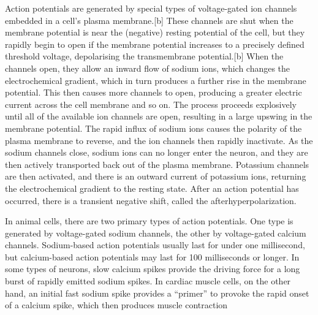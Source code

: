 Action potentials are generated by special types of voltage-gated ion channels embedded in a cell's plasma membrane.{[}b{]} These channels are shut when the membrane potential is near the (negative) resting potential of the cell, but they rapidly begin to open if the membrane potential increases to a precisely defined threshold voltage, depolarising the transmembrane potential.{[}b{]} When the channels open, they allow an inward flow of sodium ions, which changes the electrochemical gradient, which in turn produces a further rise in the membrane potential. This then causes more channels to open, producing a greater electric current across the cell membrane and so on. The process proceeds explosively until all of the available ion channels are open, resulting in a large upswing in the membrane potential. The rapid influx of sodium ions causes the polarity of the plasma membrane to reverse, and the ion channels then rapidly inactivate. As the sodium channels close, sodium ions can no longer enter the neuron, and they are then actively transported back out of the plasma membrane. Potassium channels are then activated, and there is an outward current of potassium ions, returning the electrochemical gradient to the resting state. After an action potential has occurred, there is a transient negative shift, called the afterhyperpolarization.

In animal cells, there are two primary types of action potentials. One type is generated by voltage-gated sodium channels, the other by voltage-gated calcium channels. Sodium-based action potentials usually last for under one millisecond, but calcium-based action potentials may last for 100 milliseconds or longer. In some types of neurons, slow calcium spikes provide the driving force for a long burst of rapidly emitted sodium spikes. In cardiac muscle cells, on the other hand, an initial fast sodium spike provides a ``primer'' to provoke the rapid onset of a calcium spike, which then produces muscle contraction



